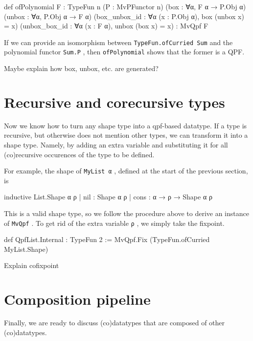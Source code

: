 \documentclass[titlepage]{report}
\newenvironment{todo}{%
\definecolor{shadecolor}{HTML}{F8E0E0}%
\begin{shaded}%
\begin{trivlist}                         
    \item[\hskip \labelsep {\bfseries Todo:}]}{\end{trivlist}\end{shaded}}
\newcommand\lean[1]{{%
\def\leanmode{1}%
\small \texttt{#1}%
\undef\leanmode%
}}
\begin{document}
\begin{leancode}
    def ofPolynomial {F : TypeFun n} 
                     (P : MvPFunctor n) 
                     (box    : ∀{α}, F α → P.Obj α) 
                     (unbox  : ∀{α}, P.Obj α → F α) 
                     (box_unbox_id : ∀{α} (x : P.Obj α), box (unbox x) = x)
                     (unbox_box_id : ∀{α} (x : F α), unbox (box x) = x)
                  : MvQpf F
\end{leancode}

If we can provide an isomorphism between \lean{TypeFun.ofCurried Sum} and the polynomial functor \lean{Sum.P}, 
then \lean{ofPolynomial} shows that the former is a QPF.

\begin{todo}
    Maybe explain how box, unbox, etc. are generated?
\end{todo}






\section{Recursive and corecursive types}
Now we know how to turn any shape type into a qpf-based datatype.
If a type is recursive, but otherwise does not mention other types, we can transform it into a shape
type.
Namely, by adding an extra variable and substituting it for all (co)recursive occurences of the type
to be defined.

For example, the shape of \lean{MyList α}, defined at the start of the previous section, is
\begin{leancode}
    inductive List.Shape α ρ
      | nil  : Shape α ρ
      | cons : α → ρ → Shape α ρ
\end{leancode}
This is a valid shape type, so we follow the procedure above to derive an instance of \lean{MvQpf}.
To get rid of the extra variable \lean{ρ}, we simply take the fixpoint.
\begin{leancode}
    def QpfList.Internal : TypeFun 2 
        := MvQpf.Fix (TypeFun.ofCurried MyList.Shape)

\end{leancode}

\begin{todo}
    Explain cofixpoint
\end{todo}



\section{Composition pipeline}
Finally, we are ready to discuss (co)datatypes that are composed of other (co)datatypes.
\end{document}
